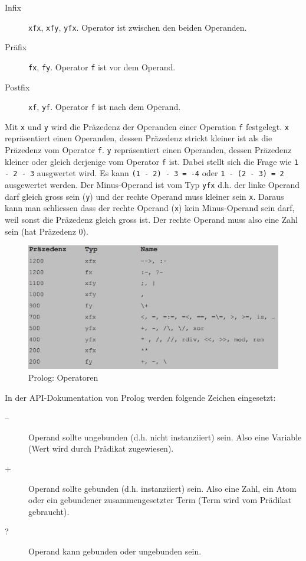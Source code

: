 \begin{description}
	\item[Infix] \verb|xfx|, \verb|xfy|, \verb|yfx|. Operator ist zwischen den beiden Operanden.
	\item[Präfix] \verb|fx|, \verb|fy|. Operator \verb|f| ist vor dem Operand.
	\item[Postfix] \verb|xf|, \verb|yf|. Operator \verb|f| ist nach dem Operand.	
\end{description}

Mit \verb|x| und \verb|y| wird die Präzedenz der Operanden einer Operation \verb|f| festgelegt. \verb|x| repräsentiert einen Operanden, dessen Präzedenz strickt kleiner ist als die Präzedenz vom Operator \verb|f|. \verb|y| repräsentiert einen Operanden, dessen Präzedenz kleiner oder gleich derjenige vom Operator \verb|f| ist. Dabei stellt sich die Frage wie \verb|1 - 2 - 3| ausgwertet wird. Es kann \verb|(1 - 2) - 3 = -4| oder \verb|1 - (2 - 3) = 2| ausgewertet werden. Der Minus-Operand ist vom Typ \verb|yfx| d.h. der linke Operand darf gleich gross sein (\verb|y|) und der rechte Operand muss kleiner sein \verb|x|. Daraus kann man schliessen dass der rechte Operand (\verb|x|) kein Minus-Operand sein darf, weil sonst die Präzedenz gleich gross ist. Der rechte Operand muss also eine Zahl sein (hat Präzedenz 0).

\begin{figure}[h!]
\centering
\includegraphics[width=0.7\linewidth]{fig/prolog-operatoren}
\caption{Prolog: Operatoren}
\label{fig:prolog-operatoren}
\end{figure}

\newpage
In der API-Dokumentation von Prolog werden folgende Zeichen eingesetzt:
\begin{description}
	\item[--] Operand sollte ungebunden (d.h. nicht instanziiert) sein. Also eine Variable (Wert wird durch Prädikat zugewiesen).
	\item[+] Operand sollte gebunden (d.h. instanziiert) sein. Also eine Zahl, ein Atom oder ein gebundener zusammengesetzter Term (Term wird vom Prädikat gebraucht).
	\item[?] Operand kann gebunden oder ungebunden sein.
\end{description}

